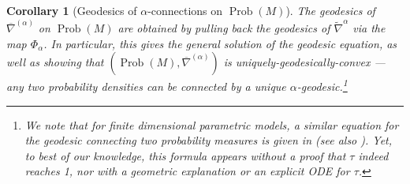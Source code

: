 \documentclass[11pt,reqno]{amsart}
\newtheorem{corollary}[theorem]{Corollary}
\theoremstyle{definition}
\newcommand{\Prob}{\operatorname{Prob}(M)}
\begin{document}
\begin{corollary}[Geodesics of $\alpha$-connections on $\Prob$]
The geodesics of $\overline{\nabla}^{(\alpha)}$ on $\Prob$ are obtained by pulling back the geodesics of $\tilde{\nabla}^{\alpha}$ via the map $\Phi_\alpha$.
In particular, this gives the general solution of the geodesic equation, as well as showing that $(\Prob,\overline{\nabla}^{(\alpha)})$ is uniquely-geodesically-convex --- any two probability densities can be connected by a unique $\alpha$-geodesic.\footnote{We note that for finite dimensional parametric models, a similar equation for the geodesic connecting two probability measures is given in \cite[Theorems 14.1, 15.1]{morozova1991markov} (see also \cite[P.~51]{ay2017information}).
Yet, to best of our knowledge, this formula appears without a proof that $\tau$ indeed reaches 1, nor with a geometric explanation or an explicit ODE for $\tau$.}
\end{corollary}
\end{document}
